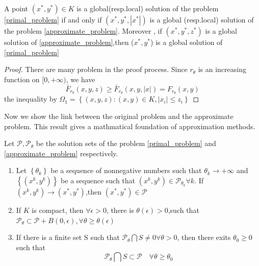 \documentclass[11pt,en,bibstyle=ieeetr]{elegantpaper}
\begin{document}
\begin{proposition}



	A point $ (x^*,y^*) \in K $ is a global(resp.local) solution of the problem \ref{primal_problem} if and only if $ (x^*,y^*,\left| x^* \right| ) $ is a global (resp.local) solution
	of the problem \ref{approximate_problem}. Moreover , if $ (x^*,y^*,z^*) $ is a global solution of \ref{approximate_problem},then ($ x^*,y^* $) is a global solution of \ref{primal_problem}
\end{proposition}
\begin{proof}
	There are many problem in the proof process. 
	Since $ r_\theta $ is an increasing function on $[0,+\infty)$, we have $$ \bar{F}_{r_\theta}(x,y,z) \geq \bar{F}_{r_\theta}(x,y,\left| x \right| ) = F_{r_\theta}(x,y) $$
the inequality by $ \Omega_1 = \left\{ (x,y,z):(x,y) \in K, \left| x_i \right| \leq z_i \right\}  $
\end{proof}


Now we show the link between the original problem and the approximate problem. This result gives a mathmatical foundation of approximation methods.

\begin{theorem}
	Let $ \mathcal{P},\mathcal{P}_\theta $ be the solution sets of the problem \ref{primal_problem} and \ref{approximate_problem} respectively.
	\begin{enumerate}
		\item Let $ \left\{ \theta_k \right\}$ be a sequence of nonnegative numbers such that $ \theta_k \to + \infty $ and
			$ \left\{ (x^k,y^k) \right\}  $ be a sequence such that $ (x^k,y^k) \in \mathcal{P}_{{\theta}_k} \forall k$. If 
			$ (x^k,y^k) \to (x^*,y^*) $,then $ (x^*,y^*) \in \mathcal{P}$
		\item If $ K $ is compact, then $ \forall \epsilon >0 $, there is $ \theta(\epsilon)>0 $,such that  $ \mathcal{P}_{\theta} \subset \mathcal{P}+B(0,\epsilon) ,\forall \theta \geq \theta(\epsilon )$
		\item If there is a finite set S such that $  \mathcal{P}_{\theta} \bigcap S \neq 0 \forall \theta >0 $, then there exits $ \theta_0 \geq 0 $ such that $$ \mathcal{P}_{\theta} \bigcap S \subset \mathcal{P} \quad \forall \theta \geq \theta_0$$
	\end{enumerate}
\end{theorem}
\end{document}
